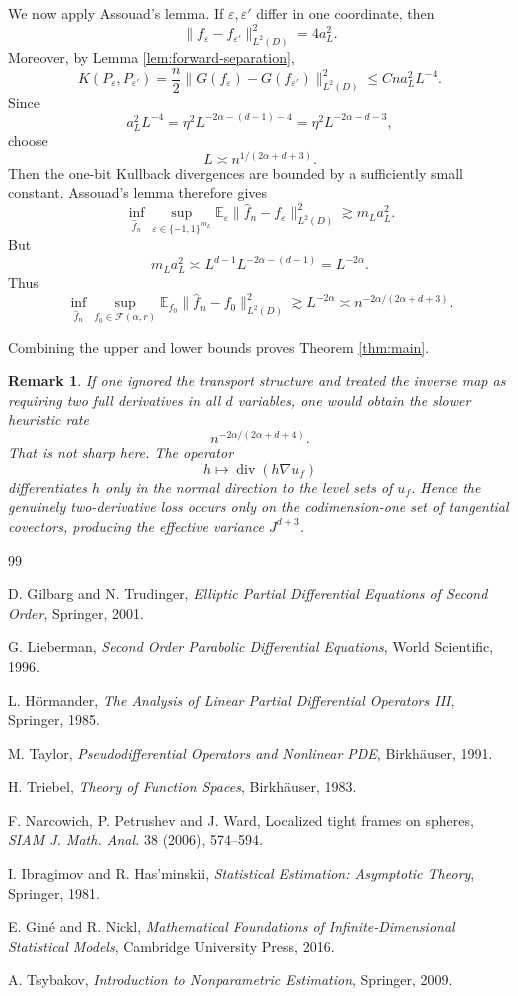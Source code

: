 \documentclass[11pt]{article}
\newtheorem{remark}{Remark}
\newcommand{\Div}{\operatorname{div}}
\newcommand{\E}{\mathbb E}
\newcommand{\cF}{\mathcal F}
\begin{document}
We now apply Assouad's lemma. If \(\varepsilon,\varepsilon'\) differ in one coordinate, then
\[
 \|f_\varepsilon-f_{\varepsilon'}\|_{L^2(D)}^2
 =
 4a_L^2.
\]
Moreover, by Lemma \ref{lem:forward-separation},
\[
 K(P_\varepsilon,P_{\varepsilon'})
 =
 \frac n2
 \|G(f_\varepsilon)-G(f_{\varepsilon'})\|_{L^2(D)}^2
 \le
 C n a_L^2L^{-4}.
\]
Since
\[
 a_L^2L^{-4}
 =
 \eta^2 L^{-2\alpha-(d-1)-4}
 =
 \eta^2 L^{-2\alpha-d-3},
\]
choose
\[
 L\asymp n^{1/(2\alpha+d+3)}.
\]
Then the one-bit Kullback divergences are bounded by a sufficiently small constant. Assouad's lemma therefore gives
\[
 \inf_{\widehat f_n}
 \sup_{\varepsilon\in\{-1,1\}^{m_L}}
 \E_\varepsilon\|\widehat f_n-f_\varepsilon\|_{L^2(D)}^2
 \gtrsim
 m_L a_L^2.
\]
But
\[
 m_La_L^2
 \asymp
 L^{d-1}L^{-2\alpha-(d-1)}
 =
 L^{-2\alpha}.
\]
Thus
\[
 \inf_{\widehat f_n}
 \sup_{f_0\in\cF(\alpha,r)}
 \E_{f_0}\|\widehat f_n-f_0\|_{L^2(D)}^2
 \gtrsim
 L^{-2\alpha}
 \asymp
 n^{-2\alpha/(2\alpha+d+3)}.
\]

Combining the upper and lower bounds proves Theorem \ref{thm:main}.

\begin{remark}
If one ignored the transport structure and treated the inverse map as requiring two full derivatives in all \(d\) variables, one would obtain the slower heuristic rate
\[
 n^{-2\alpha/(2\alpha+d+4)}.
\]
That is not sharp here. The operator
\[
 h\mapsto \Div(h\nabla u_f)
\]
differentiates \(h\) only in the normal direction to the level sets of \(u_f\). Hence the genuinely two-derivative loss occurs only on the codimension-one set of tangential covectors, producing the effective variance \(J^{d+3}\).
\end{remark}

\begin{thebibliography}{99}

D. Gilbarg and N. Trudinger,
\emph{Elliptic Partial Differential Equations of Second Order},
Springer, 2001.

G. Lieberman,
\emph{Second Order Parabolic Differential Equations},
World Scientific, 1996.

L. H\"ormander,
\emph{The Analysis of Linear Partial Differential Operators III},
Springer, 1985.

M. Taylor,
\emph{Pseudodifferential Operators and Nonlinear PDE},
Birkh\"auser, 1991.

H. Triebel,
\emph{Theory of Function Spaces},
Birkh\"auser, 1983.

F. Narcowich, P. Petrushev and J. Ward,
Localized tight frames on spheres,
\emph{SIAM J. Math. Anal.} 38 (2006), 574--594.

I. Ibragimov and R. Has'minskii,
\emph{Statistical Estimation: Asymptotic Theory},
Springer, 1981.

E. Giné and R. Nickl,
\emph{Mathematical Foundations of Infinite-Dimensional Statistical Models},
Cambridge University Press, 2016.

A. Tsybakov,
\emph{Introduction to Nonparametric Estimation},
Springer, 2009.

\end{thebibliography}
\end{document}
